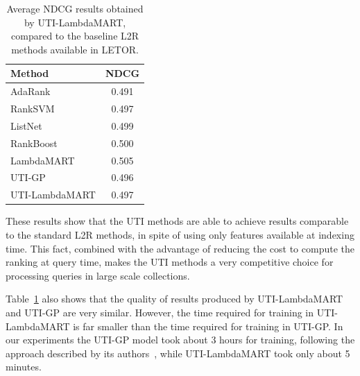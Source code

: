 \documentclass[preprint,review,10pt,3p]{elsarticle}
\begin{document}
\begin{table}[ht!]\centering

\caption{Average NDCG results obtained by UTI-LambdaMART, compared to the baseline L2R methods available in LETOR.}

\label{tab:baseline}

\vspace{.3\baselineskip}

\begin{tabular}{@{}lc@{}}

\toprule

\textbf{Method} & \textbf{NDCG} \\

\midrule

AdaRank & 0.491 \\
RankSVM & 0.497 \\
ListNet & 0.499 \\
RankBoost & 0.500 \\
LambdaMART & 0.505 \\

\midrule

UTI-GP & 0.496\\
UTI-LambdaMART & 0.497 \\

\bottomrule

\end{tabular}

\end{table}

These results show that the UTI methods are able to achieve results comparable to the standard L2R methods, in spite of using only features available at indexing time. This fact, combined with the advantage of reducing the cost to compute the ranking at query time, makes the UTI methods a very competitive choice for processing queries in large scale collections.

Table~\ref{tab:baseline} also shows that the quality of results
produced by UTI-LambdaMART and UTI-GP are very similar. However, the
time required for training in UTI-LambdaMART is far smaller than
the time required for training in UTI-GP. In our
experiments the UTI-GP model took about 3 hours for training, following the approach described by its authors~\cite{costa2012lepref}, while UTI-LambdaMART took only
about 5 minutes.
\end{document}
